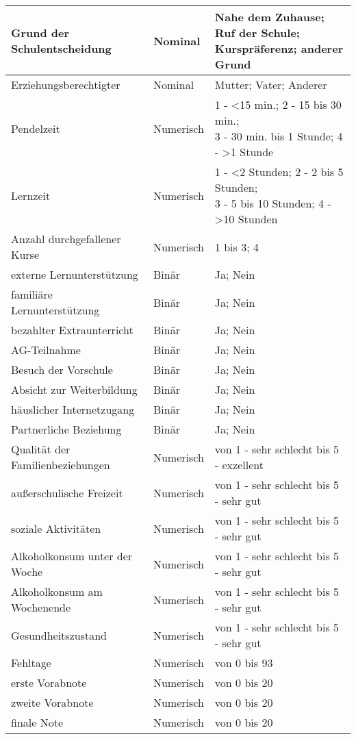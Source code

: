 \begin{table}[!ht]
\begin{tabular}{lll}
        Grund der Schulentscheidung & Nominal & \makecell[l]{Nahe dem Zuhause; Ruf der Schule; \\Kurspräferenz; anderer Grund }\\  \hline
        Erziehungsberechtigter & Nominal & Mutter; Vater; Anderer \\  \hline
        Pendelzeit & Numerisch & \makecell[l]{1 - <15 min.; 2 - 15 bis 30 min.; \\3 - 30 min. bis 1 Stunde; 4 - >1 Stunde} \\  \hline
        Lernzeit & Numerisch & \makecell[l]{1 - <2 Stunden; 2 - 2 bis 5 Stunden; \\3 - 5 bis 10 Stunden; 4 - >10 Stunden }\\  \hline
        Anzahl durchgefallener Kurse & Numerisch & 1 bis 3; 4 \\  \hline
        externe Lernunterstützung & Binär & Ja; Nein \\  \hline
        familiäre Lernunterstützung & Binär & Ja; Nein \\  \hline
        bezahlter Extraunterricht & Binär & Ja; Nein \\  \hline
        AG-Teilnahme & Binär & Ja; Nein \\  \hline
        Besuch der Vorschule & Binär & Ja; Nein \\  \hline
        Absicht zur Weiterbildung & Binär & Ja; Nein \\ \hline
        häuslicher Internetzugang & Binär & Ja; Nein \\ \hline
        Partnerliche Beziehung & Binär & Ja; Nein \\ \hline
        Qualität der Familienbeziehungen & Numerisch & von 1 - sehr schlecht bis 5 - exzellent\\ \hline
        außerschulische Freizeit & Numerisch & von 1 - sehr schlecht bis 5 - sehr gut \\ \hline
        soziale Aktivitäten & Numerisch & von 1 - sehr schlecht bis 5 - sehr gut \\ \hline
        Alkoholkonsum unter der Woche & Numerisch & von 1 - sehr schlecht bis 5 - sehr gut \\ \hline
        Alkoholkonsum am Wochenende & Numerisch & von 1 - sehr schlecht bis 5 - sehr gut \\ \hline
        Gesundheitszustand & Numerisch & von 1 - sehr schlecht bis 5 - sehr gut\\ \hline
        Fehltage & Numerisch & von 0 bis 93 \\ \hline
        erste Vorabnote & Numerisch & von 0 bis 20 \\ \hline
        zweite Vorabnote & Numerisch & von 0 bis 20 \\ \hline
        finale Note & Numerisch & von 0 bis 20 \\ \hline
    \hline
    \end{tabular}
\end{table}

